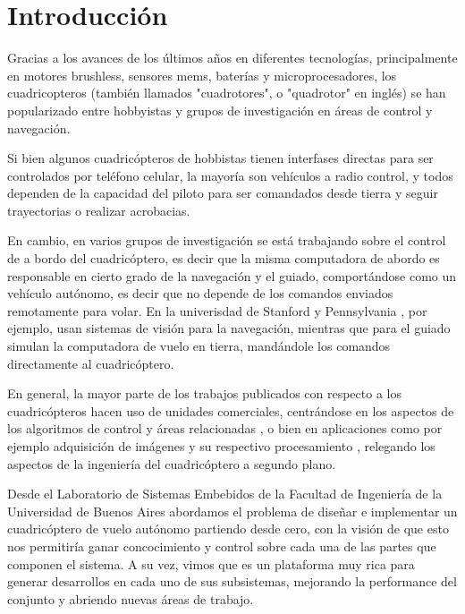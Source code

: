 \documentclass[a4paper, conference]{IEEEtran}
\begin{document}
\section{Introducción}

Gracias a los avances de los últimos años en diferentes tecnologías, principalmente en motores brushless, sensores mems, baterías y microprocesadores, los cuadricopteros (también llamados "cuadrotores", o "quadrotor" en inglés) se han popularizado entre hobbyistas y grupos de investigación en áreas de control y navegación.

Si bien algunos cuadricópteros de hobbistas \cite{parrot} tienen interfases directas para ser controlados por teléfono celular, la mayoría son vehículos a radio control, y todos dependen de la capacidad del piloto para ser comandados desde tierra y seguir trayectorias o realizar acrobacias. 

En cambio, en varios grupos de investigación se está trabajando sobre el control de a bordo del cuadricóptero, es decir que la misma computadora de abordo es responsable en cierto grado de la navegación y el guiado, comportándose como un vehículo autónomo, es decir que no depende de los comandos enviados remotamente para volar. En la univerisdad de Stanford \cite{starmac} y Pennsylvania \cite{grasp}, por ejemplo, usan sistemas de visión para la navegación, mientras que para el guiado simulan la computadora de vuelo en tierra, mandándole los comandos directamente al cuadricóptero.

En general, la mayor parte de los trabajos publicados con respecto a los cuadricópteros hacen uso de unidades comerciales, centrándose en los aspectos de los algoritmos de control y áreas relacionadas \cite{ej_control1} \cite{ej_control2}, o bien en aplicaciones como por ejemplo adquisición de imágenes y su respectivo procesamiento \cite{ej_imagenes1}, relegando los aspectos de la ingeniería del cuadricóptero a segundo plano. 

Desde el Laboratorio de Sistemas Embebidos de la Facultad de Ingeniería de la Universidad de Buenos Aires abordamos el problema de diseñar e implementar un cuadricóptero de vuelo autónomo partiendo desde cero, con la visión de que esto nos permitiría ganar concocimiento y control sobre cada una de las partes que componen el sistema. A su vez, vimos que es un plataforma muy rica para generar desarrollos en cada uno de sus subsistemas, mejorando la performance del conjunto y abriendo nuevas áreas de trabajo.
\end{document}
